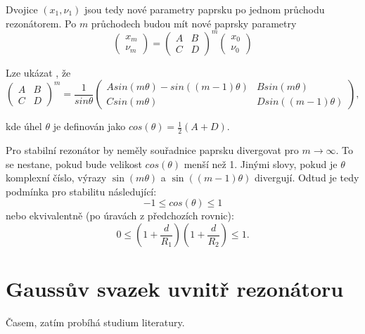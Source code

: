 \documentclass[a4paper,12pt]{article}
\begin{document}
Dvojice $(x_1, \nu_1)$ jsou tedy nové parametry paprsku po jednom průchodu rezonátorem. Po $m$ průchodech budou mít nové paprsky parametry
$$
\begin{pmatrix}
x_m \\
\nu_m
\end{pmatrix} = \begin{pmatrix}
A & B\\
C & D
\end{pmatrix}^m\begin{pmatrix}
x_0 \\
\nu_0
\end{pmatrix}
$$

Lze ukázat \cite{eowm}, že
$$
\begin{pmatrix}
A & B\\
C & D
\end{pmatrix}^m = \frac{1}{sin \theta}\begin{pmatrix}
A sin(m\theta) - sin((m-1)\theta) & B sin(m\theta) \\
C sin(m\theta) & D sin((m-1)\theta)
\end{pmatrix},
$$

kde úhel $\theta$ je definován jako $cos(\theta) = \frac{1}{2}(A+D)$.

Pro stabilní rezonátor by neměly souřadnice paprsku divergovat pro $m \rightarrow \infty$. To se nestane, pokud bude velikost $cos(\theta)$ menší než 1. Jinými slovy, pokud je $\theta$ komplexní číslo, výrazy $\sin(m \theta)$ a $\sin((m-1)\theta)$ divergují. Odtud je tedy podmínka pro stabilitu následující:
$$
-1 \le cos(\theta) \le 1
$$
nebo ekvivalentně (po úravách z předchozích rovnic):
$$
0 \le (1+\frac{d}{R_1})(1+\frac{d}{R_2}) \le 1.
$$


\section{Gaussův svazek uvnitř rezonátoru}
Časem, zatím probíhá studium literatury.
\end{document}
